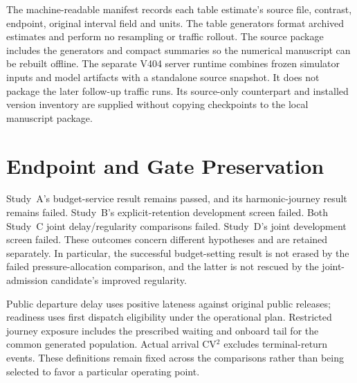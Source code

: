 The machine-readable manifest records each table estimate's source file, contrast, endpoint, original interval field and units. The table generators format archived estimates and perform no resampling or traffic rollout. The source package includes the generators and compact summaries so the numerical manuscript can be rebuilt offline. The separate V404 server runtime combines frozen simulator inputs and model artifacts with a standalone source snapshot. It does not package the later follow-up traffic runs. Its source-only counterpart and installed version inventory are supplied without copying checkpoints to the local manuscript package.

\section{Endpoint and Gate Preservation}
Study~A's budget-service result remains passed, and its harmonic-journey result remains failed. Study~B's explicit-retention development screen failed. Both Study~C joint delay/regularity comparisons failed. Study~D's joint development screen failed. These outcomes concern different hypotheses and are retained separately. In particular, the successful budget-setting result is not erased by the failed pressure-allocation comparison, and the latter is not rescued by the joint-admission candidate's improved regularity.

Public departure delay uses positive lateness against original public releases; readiness uses first dispatch eligibility under the operational plan. Restricted journey exposure includes the prescribed waiting and onboard tail for the common generated population. Actual arrival CV$^2$ excludes terminal-return events. These definitions remain fixed across the comparisons rather than being selected to favor a particular operating point.
